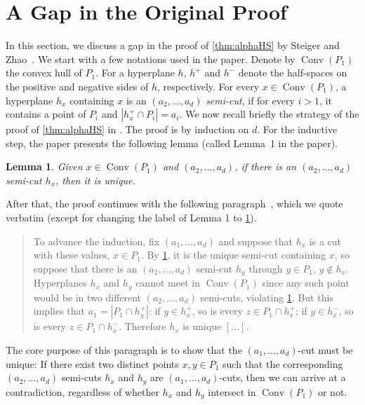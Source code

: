 \documentclass[11pt]{article}
\DeclareMathOperator{\conv}{Conv}
\newtheorem{longlemma}{Lemma}
\begin{document}
\section{A Gap in the Original Proof}
\label{app:gap}
In this section, we discuss a gap in the proof of \cref{thm:alphaHS} by Steiger and Zhao~\cite{steigerGeneralizedHamSandwichCuts2010}.
We start with a few notations used in the paper.
Denote by $\conv(P_1)$ the convex hull of $P_1$.
For a hyperplane $h$, $h^+$ and $h^-$ denote the half-spaces on the positive and negative sides of $h$, respectively.
For every $x \in \conv(P_1)$, 
a hyperplane $h_x$ containing $x$ is an $(a_2, \dots, a_d)$ \emph{semi-cut}, if for every $i > 1$, it contains a point of $P_i$ and $|h^+_x \cap P_i| = a_i$.
%
We now recall briefly the strategy of the proof of \cref{thm:alphaHS} in \cite{steigerGeneralizedHamSandwichCuts2010}.
The proof is by induction on $d$.
For the inductive step, the paper presents the following lemma (called Lemma~1 in the paper).
%
\begin{longlemma}
\label{lem:app_lem1}
Given $x \in \conv(P_1)$ and $(a_2, \dots , a_d)$, if there is an $(a_2, \dots , a_d)$ semi-cut
$h_x$, then it is unique.
\end{longlemma}
%
After that, the proof continues with the following paragraph~\cite[Page 539]{steigerGeneralizedHamSandwichCuts2010}, which we quote verbatim (except for changing the label of Lemma 1 to \cref{lem:app_lem1}).
%
\begin{quote}
    \small
    To advance the induction, fix $(a_1, . . . , a_d)$ and suppose that $h_x$ is a cut with these
values, $x \in P_1$. 
    By \cref{lem:app_lem1}, it is the unique semi-cut containing $x$, so suppose that there is an $(a_2, \dots , a_d)$ semi-cut $h_y$ through $y \in P_1$, $y \notin h_x$. Hyperplanes $h_x$ and $h_y$ cannot meet in $\conv(P_1)$ since any such point would be in two different $(a_2, \dots ,a_d)$ semi-cuts, violating \cref{lem:app_lem1}. But this implies that $a_1 = |P_1 \cap h^+_y|$: if $y \in h^+_x$, so is every $z \in P_1 \cap h^+_x$; if $y \in h^-_x$, so is every $z \in P_1 \cap h^-_x$. Therefore $h_x$ is unique $[\dots]$.
\end{quote}
%
The core purpose of this paragraph is to show that the $(a_1, \dots, a_d)$-cut must be unique:
If there exist two distinct points $x, y \in P_1$ such that the corresponding $(a_2, \dots , a_d)$ semi-cuts $h_x$ and $h_y$ are $(a_1, \dots, a_d)$-cuts, then we can arrive at a contradiction, regardless of whether $h_x$ and $h_y$ intersect in $\conv(P_1)$ or not.
\end{document}
